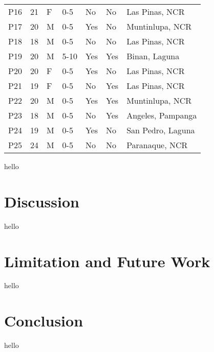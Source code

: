 \documentclass{sigchi}
\begin{document}
\begin{table*}[]
\begin{tabular}{@{}lllllll@{}}
P16 & 21 & F & 0-5  & No  & No  & Las Pinas, NCR    \\
P17 & 20 & M & 0-5  & Yes & No  & Muntinlupa, NCR   \\
P18 & 18 & M & 0-5  & No  & No  & Las Pinas, NCR    \\
P19 & 20 & M & 5-10 & Yes & Yes & Binan, Laguna     \\
P20 & 20 & F & 0-5  & Yes & No  & Las Pinas, NCR    \\
P21 & 19 & F & 0-5  & No  & Yes & Las Pinas, NCR    \\
P22 & 20 & M & 0-5  & Yes & Yes & Muntinlupa, NCR   \\
P23 & 18 & M & 0-5  & No  & Yes & Angeles, Pampanga \\
P24 & 19 & M & 0-5  & Yes & No  & San Pedro, Laguna \\
P25 & 24 & M & 0-5  & No  & No  & Paranaque, NCR    \\ \bottomrule
\end{tabular}
\end{table*}


hello

\section{Discussion}

hello

\section{Limitation and Future Work}

hello

\section{Conclusion}
hello





%



\balance{}



\end{document}
